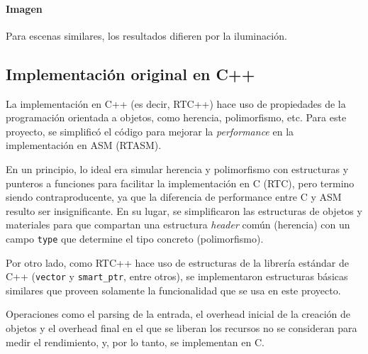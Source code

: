 \paragraph{Imagen} Para escenas similares, los resultados difieren por la
iluminación.

\subsection{Implementación original en C++}

La implementación en C++ (es decir, RTC++) hace uso de propiedades de la
programación orientada a objetos, como herencia, polimorfismo, etc. Para este
proyecto, se simplificó el código para mejorar la \textit{performance} en la
implementación en ASM (RTASM).

En un principio, lo ideal era simular herencia y polimorfismo con estructuras y
punteros a funciones para facilitar la implementación en C (RTC), pero termino
siendo contraproducente, ya que la diferencia de performance entre C y ASM
resulto ser insignificante. En su lugar, se simplificaron las estructuras de
objetos y materiales para que compartan una estructura \textit{header} común
(herencia) con un campo \texttt{type} que determine el tipo concreto
(polimorfismo).

Por otro lado, como RTC++ hace uso de estructuras de la librería estándar de C++
(\texttt{vector} y \texttt{smart\_ptr}, entre otros), se implementaron
estructuras básicas similares que proveen solamente la funcionalidad que se usa
en este proyecto.

Operaciones como el parsing de la entrada, el overhead inicial de la creación de
objetos y el overhead final en el que se liberan los recursos no se consideran
para medir el rendimiento, y, por lo tanto, se implementan en C.
